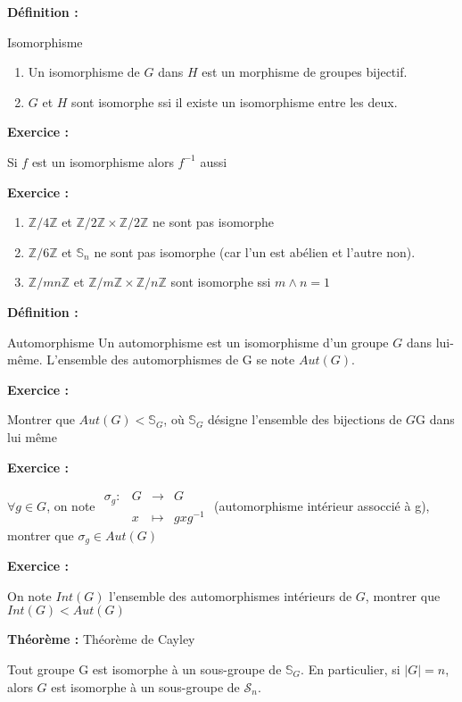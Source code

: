\documentclass{report}
\newenvironment{definition}[1][]{
    \begin{tcolorbox}[colframe= white]
    \textbf{Définition :} 
    #1 \par
    }
    {\end{tcolorbox}}
\newenvironment{exo}{\begin{tcolorbox}[colframe= white]
    \textbf{Exercice :}
    \par}
    {\end{tcolorbox}}
\newenvironment{theoreme}[1][]{
    \begin{tcolorbox}[]
    \textbf{Théorème :} #1  \par} 
    {\end{tcolorbox}}
\newcommand{\fonction}[5]{
    \begin{array}{l|rcl}
    #1: & #2 & \longrightarrow & #3 \\
        & #4 & \longmapsto & #5 
    \end{array}
}
\newcommand{\Z}{\mathbb{Z}}
\newcommand{\znz}{\Z/n\Z}
\newcommand{\sn}{\mathcal{S}_{n}}
\begin{document}
\begin{definition}{Isomorphisme}
\begin{enumerate}
    \item Un isomorphisme de $G$ dans $H$ est un morphisme de groupes bijectif.
    \item $G$ et $H$ sont isomorphe ssi il existe un isomorphisme entre les deux.
\end{enumerate}
\end{definition}

\begin{exo}
    Si $f$ est un isomorphisme alors $f^{-1}$ aussi
\end{exo}

\begin{exo}
\begin{enumerate}
    \item $\Z /4\Z$ et $\Z/2\Z \times \Z/2\Z$ ne sont pas isomorphe
    \item $\Z/6\Z$ et $\mathbb{S}_n$ ne sont pas isomorphe (car l'un est abélien et l'autre non).
    \item $\Z/mn\Z$ et $\Z/m\Z \times \znz$ sont isomorphe ssi $m\wedge n = 1$
\end{enumerate}
\end{exo}

\begin{definition}{Automorphisme}
    Un automorphisme est un isomorphisme d'un groupe $G$ dans lui-même. L'ensemble des automorphismes de G se note $Aut(G)$.
\end{definition}

\begin{exo}
    Montrer que $Aut(G) < \mathbb{S}_G$, où $\mathbb{S}_{G}$ désigne l'ensemble des bijections de $G$G dans lui même
\end{exo}

\begin{exo}
    $\forall g\in G$, on note $\fonction{\sigma_g}{G}{G}{x}{gxg^{-1}}$ (automorphisme intérieur assoccié à g), montrer que $\sigma_g \in Aut(G)$
\end{exo}

\begin{exo}
    On note $Int(G)$ l'ensemble des automorphismes intérieurs de $G$, montrer que $Int(G) < Aut(G)$
\end{exo}

\begin{theoreme}[Théorème de Cayley]
    Tout groupe G est isomorphe à un sous-groupe de $\mathbb{S}_G$. En particulier, si $|G| = n$, alors $G$ est isomorphe à un sous-groupe de $\sn$.
\end{theoreme}
\end{document}
